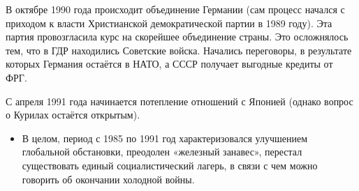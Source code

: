 В октябре 1990 года происходит объединение Германии (сам процесс начался с приходом к власти Христианской демократической партии в 1989 году). Эта партия провозгласила курс на скорейшее объединение страны. Это осложнялось тем, что в ГДР находились Советские войска. Начались переговоры, в результате которых Германия остаётся в НАТО, а СССР получает выгодные кредиты от ФРГ.

С апреля 1991 года начинается потепление отношений с Японией (однако вопрос о Курилах остаётся открытым). 
\vspace{0.5cm}
\begin{itemize}
    \item[] В целом, период с 1985 по 1991 год характеризовался улучшением глобальной обстановки, преодолен «железный занавес», перестал существовать единый социалистический лагерь, в связи с чем можно говорить об окончании холодной войны. 
\end{itemize}

